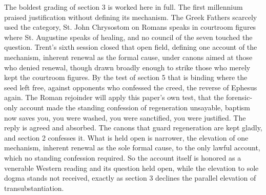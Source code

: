 \documentclass[11pt,twoside]{article}
\newcommand{\unit}[1]{\needspace{3\baselineskip}\par\medskip{\normalfont\bfseries\color{subhead}#1}\par\nobreak\smallskip}
\begin{document}
\unit{Trent on justification.}
The boldest grading of section 3 is worked here in full. The first millennium praised justification without defining its mechanism. The Greek Fathers scarcely used the category, St. John Chrysostom on Romans speaks in courtroom figures where St. Augustine speaks of healing, and no council of the seven touched the question. Trent's sixth session closed that open field, defining one account of the mechanism, inherent renewal as the formal cause, under canons aimed at those who denied renewal, though drawn broadly enough to strike those who merely kept the courtroom figures. By the test of section 5 that is binding where the seed left free, against opponents who confessed the creed, the reverse of Ephesus again. The Roman rejoinder will apply this paper's own test, that the forensic-only account made the standing confession of regeneration unsayable, baptism now saves you, you were washed, you were sanctified, you were justified. The reply is agreed and absorbed. The canons that guard regeneration are kept gladly, and section 2 confesses it. What is held open is narrower, the elevation of one mechanism, inherent renewal as the sole formal cause, to the only lawful account, which no standing confession required. So the account itself is honored as a venerable Western reading and its question held open, while the elevation to sole dogma stands not received, exactly as section 3 declines the parallel elevation of transubstantiation.
\end{document}
